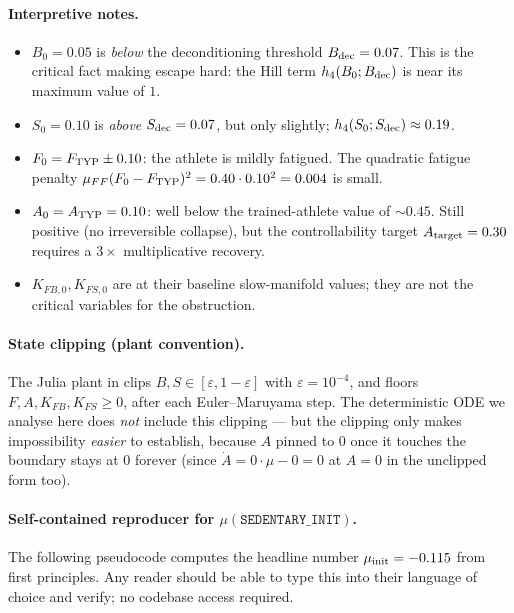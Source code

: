 \documentclass[11pt,a4paper]{article}
\theoremstyle{definition}
\begin{document}
\paragraph{Interpretive notes.}
\begin{itemize}
  \item $B_0 = 0.05$ is \emph{below} the deconditioning threshold $B_{\rm dec} = 0.07$. This is the critical fact making escape hard: the Hill term $h_4(B_0; B_{\rm dec})$ is near its maximum value of $1$.
  \item $S_0 = 0.10$ is \emph{above} $S_{\rm dec} = 0.07$, but only slightly; $h_4(S_0; S_{\rm dec}) \approx 0.19$.
  \item $F_0 = F_{\rm TYP} \pm 0.10$: the athlete is mildly fatigued. The quadratic fatigue penalty $\mu_{FF}(F_0 - F_{\rm TYP})^2 = 0.40 \cdot 0.10^2 = 0.004$ is small.
  \item $A_0 = A_{\rm TYP} = 0.10$: well below the trained-athlete value of $\sim 0.45$. Still positive (no irreversible collapse), but the controllability target $A_{\rm target} = 0.30$ requires a $3\times$ multiplicative recovery.
  \item $K_{FB,0}, K_{FS,0}$ are at their baseline slow-manifold values; they are not the critical variables for the obstruction.
\end{itemize}

\paragraph{State clipping (plant convention).} The Julia plant in  clips $B, S \in [\varepsilon, 1 - \varepsilon]$ with $\varepsilon = 10^{-4}$, and floors $F, A, K_{FB}, K_{FS} \ge 0$, after each Euler--Maruyama step. The deterministic ODE we analyse here does \emph{not} include this clipping — but the clipping only makes impossibility \emph{easier} to establish, because $A$ pinned to $0$ once it touches the boundary stays at $0$ forever (since $\dot A = 0 \cdot \mu - 0 = 0$ at $A = 0$ in the unclipped form too).

\paragraph{Self-contained reproducer for $\mu(\texttt{SEDENTARY\_INIT})$.} The following pseudocode computes the headline number $\mu_{\rm init} = -0.115$ from first principles. Any reader should be able to type this into their language of choice and verify; no codebase access required.
\end{document}
